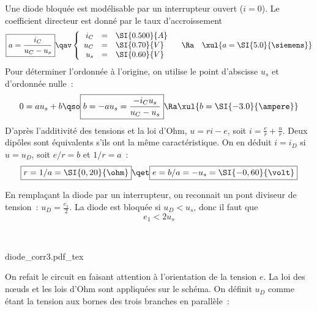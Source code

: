 \documentclass[a4paper, 10pt, garamond, oneside]{book}
\begin{document}
{
	\begin{enumerate}
     Une diode bloquée est modélisable par un interrupteur ouvert
    ($i=0$).
     Le coefficient directeur est donné par le taux d'accroissement
      \[
      \boxed{a=\frac{i_C}{u_C-u_s}}
      \qav
      \left\{
      \begin{array}{rcl}
        i_C & = & \SI{0.500}{A}
        \\
        u_C & = & \SI{0.70}{V}
        \\
        u_s & = & \SI{0.60}{V}
      \end{array}
      \right.
      \quad \Ra \quad
      \xul{
        a=\SI{5.0}{\siemens}
      }
      \]
		      Pour déterminer l'ordonnée à l'origine, on utilise le point
		      d'abscisse $u_s$ et d'ordonnée nulle~:
		      \[
			      0=au_s+b\qso
            \boxed{b=-au_s=\frac{-i_Cu_s}{u_C-u_s}}
            \Ra
            \xul{b=\SI{-3.0}{\ampere}}
		      \]
     D'après l'additivité des tensions et la loi d'Ohm, $u=ri-e$, soit
		      $\boxed{i = \frac{e}{r} + \frac{u}{r}}$.
     Deux dipôles sont équivalents s'ils ont la même caractéristique. On
		      en déduit $i=i_D$ si $u=u_D$, soit $e/r=b$ et $1/r=a$~:
          \[
            \boxed{r=1/a=\SI{0,20}{\ohm}}
            \qet
            \boxed{e=b/a=-u_s=\SI{-0,60}{\volt}}
          \]
      \noindent
      \begin{minipage}[t]{.55\linewidth}
          En remplaçant la diode par un interrupteur, on reconnait un pont
		      diviseur de tension~: $u_D=\frac{e_1}{2}$. La diode est bloquée si
		      $u_D<u_s$, donc il faut que
          \[
            \boxed{e_1<2u_s}
          \]
      \end{minipage}
      \hfill
      \begin{minipage}[t]{.4\linewidth}
        ~
        \vspace{-40pt}
		      \begin{center}
			      {diode_corr3.pdf_tex}
		      \end{center}
      \end{minipage}
      \noindent
      \begin{minipage}[t]{.55\linewidth}
          On refait le circuit en faisant attention à l'orientation de la
		      tension $e$.
		      La loi des nœuds et les lois d'Ohm sont appliquées sur le schéma.
		      On définit $u_D$ comme étant la tension aux bornes des trois
		      branches en parallèle~:
		      \begin{align}

\end{align}
\end{minipage}
\end{enumerate}}
\end{document}
